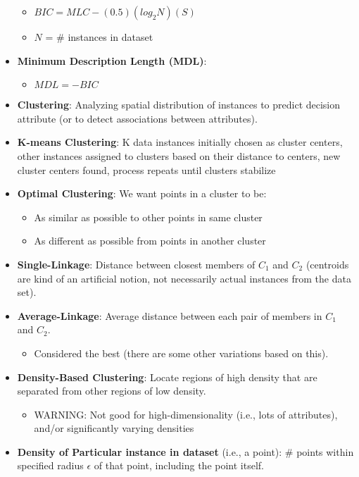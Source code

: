 \documentclass[fontsize=4pt]{scrartcl}
\begin{document}
\begin{multicols}{3}
\begin{itemize}
\begin{itemize}
			\item $BIC = MLC - (0.5)(log_2 N)(S)$
			\item $N$ = \# instances in dataset
		\end{itemize}
	\item {\bf Minimum Description Length (MDL)}:
		\begin{itemize}
			\item $MDL = -BIC$
		\end{itemize}
	\item {\bf Clustering}: Analyzing spatial distribution of instances to predict decision attribute (or to detect associations between attributes).
	\item {\bf K-means Clustering}: K data instances initially chosen as cluster centers, other instances assigned to clusters based on their distance to centers, new cluster centers found, process repeats until clusters stabilize
	\item {\bf Optimal Clustering}: We want points in a cluster to be:
		\begin{itemize}
			\item As similar as possible to other points in same cluster
			\item As different as possible from points in another cluster
		\end{itemize}
	\item {\bf Single-Linkage}: Distance between closest members of $C_1$ and $C_2$ (centroids are kind of an artificial notion, not necessarily actual instances from the data set).
	\item {\bf Average-Linkage}: Average distance between each pair of members in $C_1$ and $C_2$. 
		\begin{itemize}
			\item Considered the best (there are some other variations based on this).
		\end{itemize}
	\item {\bf Density-Based Clustering}: Locate regions of high density that are separated from other regions of low density.
		\begin{itemize}
			\item WARNING: Not good for high-dimensionality (i.e., lots of attributes), and/or significantly varying densities
		\end{itemize}
	\item {\bf Density of Particular instance in dataset} (i.e., a point): \# points within specified radius  $\epsilon$ of that point, including the point itself.
		\begin{enumerate}

\end{enumerate}
\end{itemize}
\end{multicols}
\end{document}
